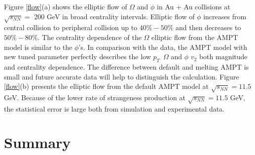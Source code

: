 \documentclass[twocolumn,aps,prc,showpacs,superscriptaddress,preprintnumbers,floatfix,nofootinbib]{revtex4}
\newcommand{ \pt } {${p_{T}}$}
\begin{document}
\begin{CJK*}{GBK}{song}
Figure \ref{flow}(a) shows the elliptic flow of $\Omega$ and $\phi$ in Au + Au collisions at $\sqrt{s_{NN}} =$ 200 GeV in broad centrality intervals. Elliptic flow of $\phi$ increases from central collision to peripheral collision up to $40\%-50\%$ and then decreases to $50\%-80\%$. The centrality dependence of the $\Omega$ elliptic flow from the AMPT model is similar to the $\phi$'s. In comparison with the data, the AMPT model with new tuned parameter perfectly describes the low \pt~$\Omega$ and $\phi$ $v_2$ both magnitude and centrality dependence. The difference between default and melting AMPT is small and future accurate data will help to distinguish the calculation. Figure \ref{flow}(b) presents the elliptic flow from the default AMPT model at $\sqrt{s_{NN}} = 11.5$ GeV. Because of the lower rate of strangeness production at $\sqrt{s_{NN}} = 11.5$ GeV, the statistical error is large both from simulation and experimental data.

\section{Summary}


\end{CJK*}
\end{document}
